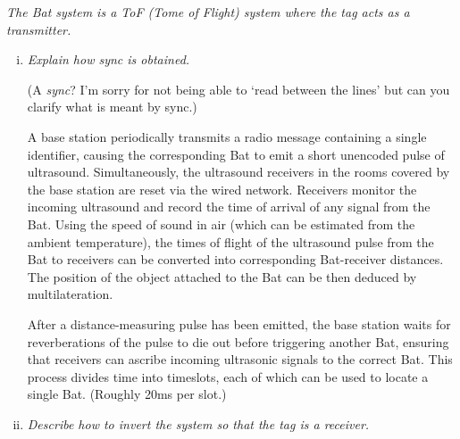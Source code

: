 \documentclass[12pt]{article}
\newcommand*\circled[1]{\tikz[baseline=(char.base)]{
		\node[shape=circle,draw,inner sep=0pt] (char) {#1};}}
\begin{document}
\textit{\circled{7.} The Bat system is a ToF (Tome of Flight) system where the
tag acts as a transmitter.}
\begin{enumerate}[i)]
    \item \textit{Explain how sync is obtained.}

        (A \textit{sync}? I'm sorry for not being able to `read between the lines' but can you clarify what is meant by sync.)

        A base station periodically transmits a radio message containing
        a single identifier, causing the corresponding Bat to emit a short
        unencoded pulse of ultrasound. Simultaneously, the ultrasound receivers
        in the rooms covered by the base station are reset via the wired
        network. Receivers monitor the incoming ultrasound and record the time
        of arrival of any signal from the Bat. Using the speed of sound in air
        (which can be estimated from the ambient temperature), the times of
        flight of the ultrasound pulse from the Bat to receivers can be
        converted into corresponding Bat-receiver distances. The position of
        the object attached to the Bat can be then deduced by multilateration.

        After a distance-measuring pulse has been emitted, the base station
        waits for reverberations of the pulse to die out before triggering
        another Bat, ensuring that receivers can ascribe incoming ultrasonic
        signals to the correct Bat. This process divides time into timeslots,
        each of which can be used to locate a single Bat. (Roughly 20ms per
        slot.)
    \item \textit{Describe how to invert the system so that the tag is a receiver.}


\end{enumerate}
\end{document}
